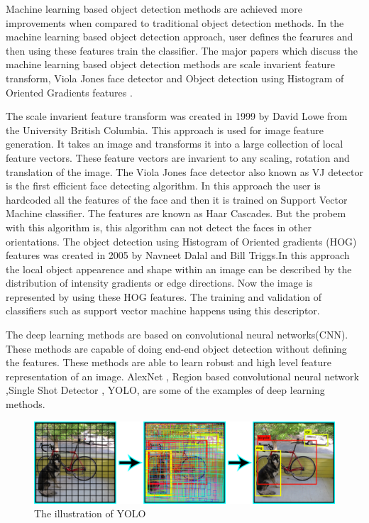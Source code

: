 \documentclass{svproc}
\begin{document}
\par 
Machine learning based object detection methods are achieved more improvements when compared to traditional object detection methods. In the machine learning based object detection approach, user defines the fearures and then using these features train the classifier. The major papers which discuss the machine learning based object detection methods are scale invarient feature transform, Viola Jones face detector \cite{2} and  Object detection using Histogram of Oriented Gradients features \cite{4}. 
\par 
The scale invarient feature transform \cite{sift} was created in 1999 by David Lowe from the University British Columbia. This approach is used for image feature generation. It takes an image and transforms it into a large collection of local feature vectors. These feature vectors are invarient to any scaling, rotation and translation of the image. The Viola Jones face detector also known as VJ detector \cite{2} is the first efficient face detecting algorithm. In this approach the user is hardcoded all the features of the face and then it is trained on Support Vector Machine classifier. The features are known as Haar Cascades. But the probem with this algorithm is, this algorithm can not  detect the faces in other orientations. The object detection using Histogram of Oriented gradients (HOG) \cite{4} features was created in 2005 by Navneet Dalal and Bill Triggs.In this approach the local object appearence and shape within an image can be described by the distribution of intensity gradients or edge directions. Now the image is represented by using these HOG features. The training and validation of classifiers such as support vector machine happens using this descriptor.  
\par
The deep learning methods are based on convolutional neural networks(CNN). These methods are capable of doing end-end object detection without defining the features. These methods are able to learn robust and high level feature representation of an image. AlexNet \cite{alexnet}, Region based convolutional neural network \cite{8},Single Shot Detector \cite{ssd}, YOLO, are some of the examples of deep  learning methods. 
\par 
\begin{figure}[!h]
	\includegraphics[width=\columnwidth]{./images/yolo.png}
	\caption{The illustration of YOLO}
	\label{yolo}
\end{figure} 
\end{document}
